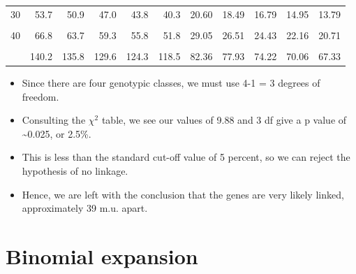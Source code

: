\documentclass[11pt,ignorenonframetext,aspectratio=169]{beamer}
\providecommand{\tightlist}{%
  \setlength{\itemsep}{0pt}\setlength{\parskip}{0pt}}
\begin{document}
\begin{frame}{}
\begin{table}
\begin{tabular}[t]{lrrrr|>{}rrrrrr}
30 & 53.7 & 50.9 & 47.0 & 43.8 & 40.3 & 20.60 & 18.49 & 16.79 & 14.95 & 13.79\\
\cellcolor{gray!6}{35} & \cellcolor{gray!6}{60.3} & \cellcolor{gray!6}{57.3} & \cellcolor{gray!6}{53.2} & \cellcolor{gray!6}{49.8} & \cellcolor{gray!6}{46.1} & \cellcolor{gray!6}{24.80} & \cellcolor{gray!6}{22.47} & \cellcolor{gray!6}{20.57} & \cellcolor{gray!6}{18.51} & \cellcolor{gray!6}{17.19}\\
40 & 66.8 & 63.7 & 59.3 & 55.8 & 51.8 & 29.05 & 26.51 & 24.43 & 22.16 & 20.71\\
\cellcolor{gray!6}{50} & \cellcolor{gray!6}{79.5} & \cellcolor{gray!6}{76.2} & \cellcolor{gray!6}{71.4} & \cellcolor{gray!6}{67.5} & \cellcolor{gray!6}{63.2} & \cellcolor{gray!6}{37.69} & \cellcolor{gray!6}{34.76} & \cellcolor{gray!6}{32.36} & \cellcolor{gray!6}{29.71} & \cellcolor{gray!6}{27.99}\\
\addlinespace
100 & 140.2 & 135.8 & 129.6 & 124.3 & 118.5 & 82.36 & 77.93 & 74.22 & 70.06 & 67.33\\
\bottomrule
\end{tabular}
\end{table}
\end{frame}

\begin{frame}{}
\protect\hypertarget{section-5}{}
\begin{itemize}
\tightlist
\item
  Since there are four genotypic classes, we must use 4-1 = 3 degrees of
  freedom.
\item
  Consulting the \(\chi^2\) table, we see our values of 9.88 and 3 df
  give a p value of \textasciitilde0.025, or 2.5\%.
\item
  This is less than the standard cut-off value of 5 percent, so we can
  reject the hypothesis of no linkage.
\item
  Hence, we are left with the conclusion that the genes are very likely
  linked, approximately 39 m.u. apart.
\end{itemize}
\end{frame}

\hypertarget{binomial-expansion}{%
\section{Binomial expansion}\label{binomial-expansion}}
\end{document}

